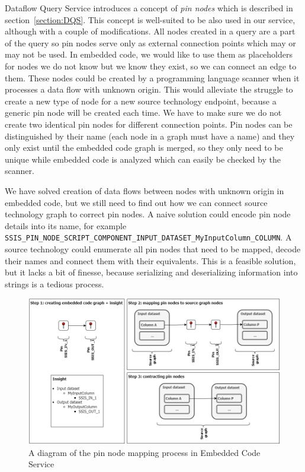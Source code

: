 Dataflow Query Service introduces a concept of \textit{pin nodes} which is described in section~\ref{section:DQS}. This concept is well-suited to be also used in our service, although with a couple of modifications. All nodes created in a query are a part of the query so pin nodes serve only as external connection points which may or may not be used. In embedded code, we would like to use them as placeholders for nodes we do not know but we know they exist, so we can connect an edge to them. These nodes could be created by a programming language scanner when it processes a data flow with unknown origin. This would alleviate the struggle to create a new type of node for a new source technology endpoint, because a generic pin node will be created each time. We have to make sure we do not create two identical pin nodes for different connection points. Pin nodes can be distinguished by their name (each node in a graph must have a name) and they only exist until the embedded code graph is merged, so they only need to be unique while embedded code is analyzed which can easily be checked by the scanner.
\par
We have solved creation of data flows between nodes with unknown origin in embedded code, but we still need to find out how we can connect source technology graph to correct pin nodes. A naive solution could encode pin node details into its name, for example \texttt{SSIS\_PIN\_NODE\_SCRIPT\_COMPONENT\_INPUT\_DATASET\_MyInputColumn\_COLUMN}. A source technology could enumerate all pin nodes that need to be mapped, decode their names and connect them with their equivalents. This is a feasible solution, but it lacks a bit of finesse, because serializing and deserializing information into strings is a tedious process.
\begin{figure}[ht]\centering
\includegraphics[width=1.0\textwidth]{img/pin_nodes_ecs.png}
\caption{A diagram of the pin node mapping process in Embedded Code Service}
\label{fig:pinNodesECS}
\end{figure} 
